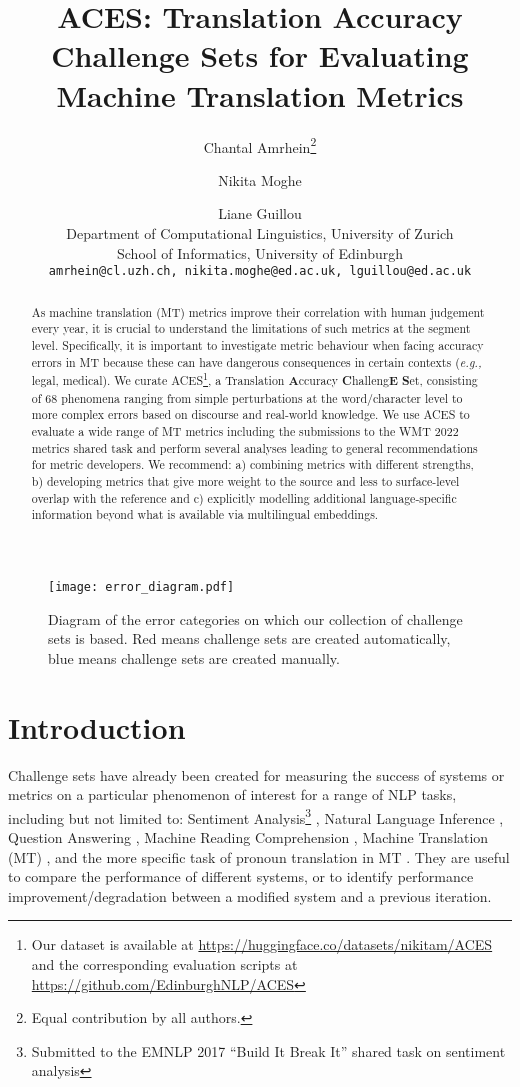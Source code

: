 \documentclass[11pt]{article}
\title{\textsc{ACES}: Translation Accuracy Challenge Sets for Evaluating Machine Translation Metrics}
\author{Chantal Amrhein\thanks{{ } Equal contribution by all authors.} \and Nikita Moghe\footnotemark[1]  \and Liane Guillou\footnotemark[1] \\
  Department of Computational Linguistics, University of Zurich\\
  School of Informatics, University of Edinburgh \\ \medskip
  \texttt{amrhein@cl.uzh.ch, nikita.moghe@ed.ac.uk, lguillou@ed.ac.uk}}
\begin{document}
\maketitle
\begin{abstract}
As machine translation (MT) metrics improve their correlation with human judgement every year, it is crucial to understand the limitations of such metrics at the segment level. Specifically, it is important to investigate metric behaviour when facing accuracy errors in MT because these can have dangerous consequences in certain contexts (\textit{e.g.,} legal, medical). We curate \textsc{ACES}\footnote{Our dataset is available at \url{https://huggingface.co/datasets/nikitam/ACES} and the corresponding evaluation scripts at \url{https://github.com/EdinburghNLP/ACES}}, a Translation \textbf{A}ccuracy \textbf{C}halleng\textbf{E} \textbf{S}et, consisting of 68 phenomena ranging from simple perturbations at the word/character level to more complex errors based on discourse and real-world knowledge. We use \textsc{ACES} to evaluate a wide range of MT metrics including the submissions to the WMT 2022 metrics shared task and perform several analyses leading to general recommendations for metric developers. We recommend: a) combining metrics with different strengths, b) developing metrics that give more weight to the source and less to surface-level overlap with the reference and c) explicitly modelling additional language-specific information beyond what is available via multilingual embeddings.

\end{abstract}

\begin{figure*}
    \centering
    \texttt{[image: error\_diagram.pdf]}
    \caption{Diagram of the error categories on which our collection of challenge sets is based. Red means challenge sets are created automatically, blue means challenge sets are created manually.}
    \label{fig:diagram}
\end{figure*}

\section{Introduction}
Challenge sets have already been created for measuring the success of systems or metrics on a particular phenomenon of interest for a range of NLP tasks, including but not limited to: Sentiment Analysis\footnote{Submitted to the EMNLP 2017 ``Build It Break It'' shared task on sentiment analysis} \citep{li-etal-2017-bibi,mahler-etal-2017-breaking,staliunaite-bonfil-2017-breaking}, Natural Language Inference \citep{mccoy2019non,Rocchietti2021FANCYAD}, Question Answering \citep{ravichander-etal-2021-noiseqa}, Machine Reading Comprehension \citep{khashabi-etal-2018-looking}, Machine Translation (MT) \citep{king-falkedal-1990-using,isabelle-etal-2017-challenge}, and the more specific task of pronoun translation in MT \citep{guillou-hardmeier-2016-protest}. They are useful to compare the performance of different systems, or to identify performance improvement/degradation between a modified system and a previous iteration.
\end{document}
